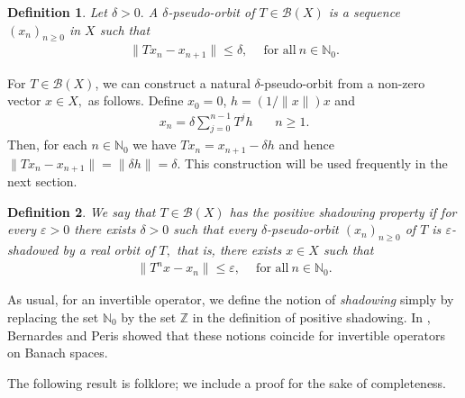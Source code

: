 \documentclass[11pt]{amsart}
\newtheorem{definition}{Definition}[section]
\theoremstyle{plain}
\theoremstyle{remark}
\theoremstyle{plain}
\begin{document}
\begin{definition} \normalfont Let $\delta>0.$ A $\delta$-\textit{pseudo-orbit} of $T\in \mathcal{B}(X)$ is a sequence $(x_n)_{n \geq 0}$ in $X$ such that
\begin{align*}
\|Tx_n-x_{n+1}\|\leq \delta, \quad \ \text{for all} \ n\in \mathbb{N}_0.
\end{align*}
\end{definition}
For $T\in \mathcal{B}(X)$, we can construct a natural $\delta$-pseudo-orbit from a non-zero vector $x\in X,$ as follows. Define $x_0 = 0$, $h = (1/\|x\|)x$  and 
\begin{align*}
x_n= \delta  \sum_{j=0}^{n-1}T^j h  \,\ \,\  \quad n\geq 1.
\end{align*}
Then, for each $n\in\mathbb{N}_0$ we have $Tx_n=x_{n+1}- \delta h$ and hence $\|Tx_n-x_{n+1}\|=\|\delta h\|=\delta.$ This construction will be used frequently in the next section.


\begin{definition} \normalfont We say that $T\in \mathcal{B}(X)$  has the \textit{positive shadowing} property  if for every $\varepsilon>0$ there exists $\delta>0$ such that every $\delta$-pseudo-orbit $(x_n)_{n \geq 0}$ of $T$ is $\varepsilon$-shadowed  by a real orbit of $T,$ that is, there exists $ x \in X$ such that 
\begin{align*}
\|T^nx-x_n\|\leq \varepsilon, \quad \ \text{for all} \ n\in \mathbb{N}_0.
\end{align*}
\end{definition}




As usual, for an invertible operator, we define the notion of \textit{shadowing} simply
by replacing the set $\mathbb{N}_0$ by the set $\mathbb{Z}$ in the definition  of positive shadowing. In \cite[Theorem 1]{Bernardes_Alfred_Shadowing2024}, Bernardes and Peris showed that these notions coincide for invertible operators on Banach spaces. 


The following result is folklore; we include a proof for the sake of completeness.
\end{document}
